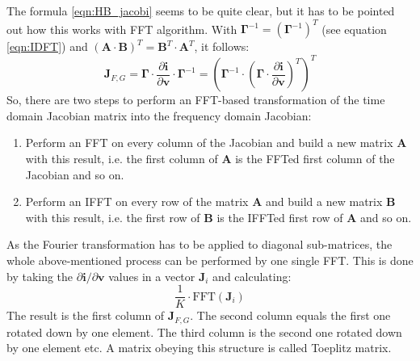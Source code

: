 The formula \ref{eqn:HB_jacobi} seems to be quite clear, but it has to be pointed out how
this works with FFT algorithm. With
$\boldsymbol{\Gamma}^{-1} = (\boldsymbol{\Gamma}^{-1})^T$
(see equation \ref{eqn:IDFT}) and
$(\boldsymbol{A}\cdot\boldsymbol{B})^T = \boldsymbol{B}^T\cdot \boldsymbol{A}^T$,
it follows:
\begin{equation}
\boldsymbol{J}_{F,G}
  = \boldsymbol{\Gamma}\cdot\frac{\partial\boldsymbol{i}}{\partial\boldsymbol{v}}
    \cdot\boldsymbol{\Gamma}^{-1}
  = \left( \boldsymbol{\Gamma}^{-1}\cdot \left( \boldsymbol{\Gamma} \cdot
    \frac{\partial\boldsymbol{i}}{\partial\boldsymbol{v}} \right)^T \right)^T
\end{equation}
So, there are two steps to perform an FFT-based transformation of the time
domain Jacobian matrix into the frequency domain Jacobian:
\begin{enumerate}
\item Perform an FFT on every column of the Jacobian and build a new matrix
      $\boldsymbol{A}$ with this result, i.e. the first column of
      $\boldsymbol{A}$ is the FFTed first column of the Jacobian and so on.
\item Perform an IFFT on every row of the matrix $\boldsymbol{A}$ and build
      a new matrix $\boldsymbol{B}$ with this result, i.e. the first row of
      $\boldsymbol{B}$ is the IFFTed first row of $\boldsymbol{A}$ and so on.
\end{enumerate}
As the Fourier transformation has to be applied to diagonal sub-matrices,
the whole above-mentioned process can be performed by one single FFT. This
is done by taking the $\partial\boldsymbol{i} / \partial\boldsymbol{v}$
values in a vector $\boldsymbol{J}_i$ and calculating:
\begin{equation}
\label{eqn:sMatFFT}
\dfrac{1}{K}\cdot\text{FFT}\left(\boldsymbol{J}_i\right)
\end{equation}
The result is the first column of $\boldsymbol{J}_{F,G}$. The second column
equals the first one rotated down by one element. The third column is the
second one rotated down by one element etc. A matrix obeying this structure
is called Toeplitz matrix.

\addvspace{12pt}

